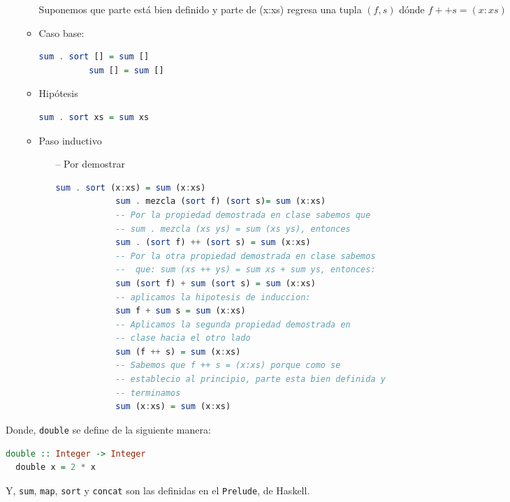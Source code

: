 \documentclass[spanish,12pt,letterpaper]{article}
\begin{document}
\begin{itemize}
\begin{itemize}
        Suponemos que parte está bien definido y parte de (x:xs) regresa una
        tupla $(f,s)$ dónde $f ++ s = (x:xs) $

      \item Caso base:
        \begin{lstlisting}[language=Haskell]
          sum . sort [] = sum []
          sum [] = sum [] \end{lstlisting}
      \item Hipótesis
        \begin{lstlisting}[language=Haskell]
          sum . sort xs = sum xs \end{lstlisting}
      \item Paso inductivo
        \begin{itemize}
        \item [--] Por demostrar
          \begin{lstlisting}[language=Haskell]
            sum . sort (x:xs) = sum (x:xs)
            sum . mezcla (sort f) (sort s)= sum (x:xs)
            -- Por la propiedad demostrada en clase sabemos que
            -- sum . mezcla (xs ys) = sum (xs ys), entonces
            sum . (sort f) ++ (sort s) = sum (x:xs)
            -- Por la otra propiedad demostrada en clase sabemos
            --  que: sum (xs ++ ys) = sum xs + sum ys, entonces:
            sum (sort f) + sum (sort s) = sum (x:xs)
            -- aplicamos la hipotesis de induccion:
            sum f + sum s = sum (x:xs)
            -- Aplicamos la segunda propiedad demostrada en
            -- clase hacia el otro lado
            sum (f ++ s) = sum (x:xs)
            -- Sabemos que f ++ s = (x:xs) porque como se
            -- establecio al principio, parte esta bien definida y
            -- terminamos
            sum (x:xs) = sum (x:xs) \end{lstlisting}
        \end{itemize}
    \end{itemize}

\end{itemize}
Donde, \texttt{double} se define de la siguiente manera:
\begin{lstlisting}[language=Haskell]
  double :: Integer -> Integer
  double x = 2 * x\end{lstlisting}
  Y, \texttt{sum}, \texttt{map}, \texttt{sort} y \texttt{concat} son las definidas en
  el \texttt{Prelude}, de Haskell.
\end{document}
